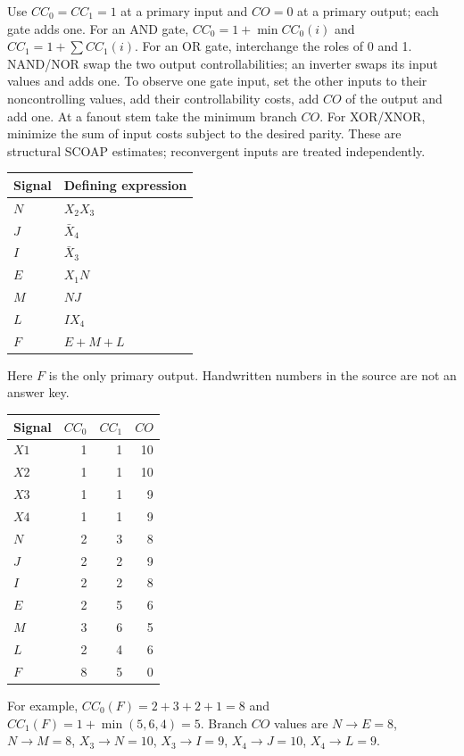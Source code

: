 \documentclass[11pt]{article}
\begin{document}
Use $CC_0=CC_1=1$ at a primary input and $CO=0$ at a primary output;
each gate adds one. For an AND gate,
$CC_0=1+\min CC_0(i)$ and $CC_1=1+\sum CC_1(i)$.
For an OR gate, interchange the roles of 0 and 1.
NAND/NOR swap the two output controllabilities; an inverter swaps its input
values and adds one. To observe one gate input, set the other inputs to their
noncontrolling values, add their controllability costs, add $CO$ of the output
and add one. At a fanout stem take the minimum branch $CO$.
For XOR/XNOR, minimize the sum of input costs subject to the desired parity.
These are structural SCOAP estimates; reconvergent inputs are treated independently.
\begin{center}\begin{tabular}{ll}\toprule Signal & Defining expression\\\midrule
$N$ & $X_2X_3$\\
$J$ & $\bar X_4$\\
$I$ & $\bar X_3$\\
$E$ & $X_1N$\\
$M$ & $NJ$\\
$L$ & $IX_4$\\
$F$ & $E+M+L$\\
\bottomrule\end{tabular}\end{center}
Here $F$ is the only primary output.
Handwritten numbers in the source are not an answer key.
\begin{center}\begin{tabular}{lrrr}\toprule
Signal & $CC_0$ & $CC_1$ & $CO$\\\midrule
$X1$ & 1 & 1 & 10\\
$X2$ & 1 & 1 & 10\\
$X3$ & 1 & 1 & 9\\
$X4$ & 1 & 1 & 9\\
$N$ & 2 & 3 & 8\\
$J$ & 2 & 2 & 9\\
$I$ & 2 & 2 & 8\\
$E$ & 2 & 5 & 6\\
$M$ & 3 & 6 & 5\\
$L$ & 2 & 4 & 6\\
$F$ & 8 & 5 & 0\\
\bottomrule\end{tabular}\end{center}
For example,
$CC_0(F)=2+3+2+1=8$ and $CC_1(F)=1+\min(5,6,4)=5$.
Branch $CO$ values are $N\to E=8$, $N\to M=8$,
$X_3\to N=10$, $X_3\to I=9$,
$X_4\to J=10$, $X_4\to L=9$.
\end{document}
